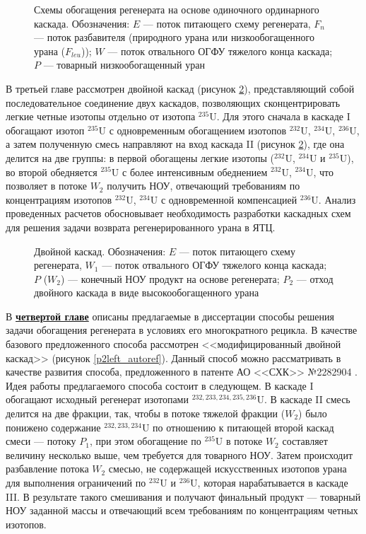 \begin{figure}[ht]
  \caption{Схемы обогащения регенерата на основе одиночного ординарного каскада. Обозначения: $E$ --- поток питающего схему регенерата, $F_n$ --- поток разбавителя (природного урана или низкообогащенного урана ($F_{leu}$)); $W$ --- поток отвального ОГФУ тяжелого конца каскада; $P$ --- товарный низкообогащенный уран}\label{fig:diagram1ch3}
\end{figure}

В третьей главе рассмотрен двойной каскад (рисунок \ref{fig:double_ru_in3}), представляющий собой последовательное соединение двух каскадов, позволяющих сконцентрировать легкие четные изотопы отдельно от изотопа $^{235}$U. Для этого сначала в каскаде I обогащают изотоп $^{235}$U с одновременным обогащением изотопов $^{232}$U, $^{234}$U, $^{236}$U, а затем полученную смесь направляют на вход каскада II (рисунок \ref{fig:double_ru_in3}), где она делится на две группы: в первой обогащены легкие изотопы ($^{232}$U, $^{234}$U и $^{235}$U), во второй обедняется $^{235}$U с более интенсивным обеднением $^{232}$U, $^{234}$U, что позволяет в потоке $W_2$ получить НОУ, отвечающий требованиям по концентрациям изотопов $^{232}$U, $^{234}$U с одновременной компенсацией $^{236}$U. Анализ проведенных расчетов обосновывает необходимость разработки каскадных схем для решения задачи возврата регенерированного урана в ЯТЦ.

\begin{figure}[ht]
  \caption{Двойной каскад. Обозначения: $E$ --- поток питающего схему регенерата, $W_1$ --- поток отвального ОГФУ тяжелого конца каскада; $P$ ($W_2$) --- конечный НОУ продукт на основе регенерата; $P_2$ --- отход двойного каскада в виде высокообогащенного урана}\label{fig:double_ru_in3}
\end{figure}


В \underline{\textbf{четвертой главе}} описаны предлагаемые в диссертации способы решения задачи обогащения регенерата в условиях его многократного рецикла.
В качестве базового предложенного способа рассмотрен <<модифицированный двойной каскад>> (рисунок \ref{p2left_autoref}). Данный способ можно рассматривать в качестве развития способа, предложенного в патенте АО <<СХК>> №2282904 \cite{EXTvodolazskihSposobIzotopnogoVosstanovleniya}. Идея работы предлагаемого способа состоит в следующем. В каскаде I обогащают исходный регенерат изотопами $^{232,233,234,235,236}$U. В каскаде II смесь делится на две фракции, так, чтобы в потоке тяжелой фракции ($W_2$) было понижено содержание $^{232,233,234}$U по отношению к питающей второй каскад смеси --- потоку $P_1$, при этом обогащение по $^{235}$U в потоке $W_2$ составляет величину несколько выше, чем требуется для товарного НОУ. Затем происходит разбавление потока $W_2$ смесью, не содержащей искусственных изотопов урана для выполнения ограничений по $^{232}$U и $^{236}$U, которая нарабатывается в каскаде III. В результате такого смешивания и получают финальный продукт --- товарный НОУ заданной массы и отвечающий всем требованиям по концентрациям четных изотопов. 

